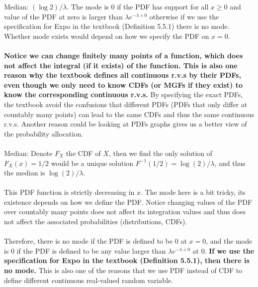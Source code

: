 
\setcounter{theorem}{1}
\begin{exercise} [BH.6.2]

\begin{solution}
    Median: $(\log2)/\lambda$. The mode is 0 if the PDF has support for all $x\geq 0$ and value of the PDF at zero is larger than $\lambda e^{-\lambda \times 0}$ otherwise if we use the specification for Expo in the textbook (Definition 5.5.1) there is no mode. 
	Whether mode exists would depend on how we specify the PDF on $x=0$.\\~\\
    \textbf{Notice we can change finitely 
		many points of a function, which does not affect the integral (if it exists) of the function. This is also one reason why the textbook defines all continuous r.v.s by their PDFs, even though we only need to know CDFs (or MGFs if they exist) to know the corresponding continuous r.v.s.} By specifying the exact PDFs, the textbook avoid the confusions that different PDFs (PDFs that only differ at countably many points) can lead to the same CDFs and thus the same continuous r.v.s. Another reason could be looking at PDFs graphs gives us a better view of the probability  allocation.  
	\\~\\
	Median: Denote $F_X$ the CDF of $X$, then we find the only solution of $F_X(x)=1/2$ would be a unique solution $F^{-1}(1/2)= \log(2)/\lambda$, and thus 
	the median is $\log(2)/\lambda$.
	~\\~\\
	This PDF function is strictly decreasing in $x$. The mode here is a bit tricky, its existence depends on how we define the PDF. Notice changing values of the PDF over countably many points does not affect its integration values and thus does not affect the associated probabilities (distributions, CDFs).  \\~\\
	Therefore, there is no mode if the PDF is defined to be 0 at $x = 0$, and the mode is 0 if the PDF is defined to be any value larger than $\lambda e^{-\lambda \times 0}$ at 0. \textbf{If we use the specification for Expo in the textbook (Definition 5.5.1), then there is no mode.} This is also one of the reasons that we use PDF instead of CDF to define different continuous real-valued random variable.  \\
	

\end{solution}
\end{exercise}
